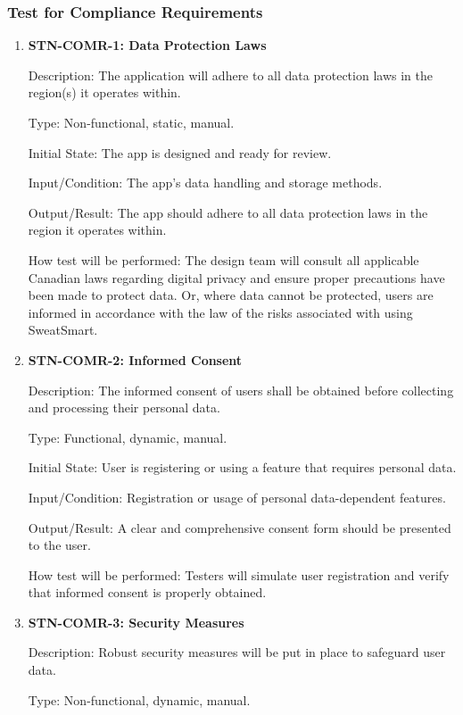 \documentclass[12pt, titlepage]{article}
\begin{document}
\subsubsection{Test for Compliance Requirements}

\begin{enumerate}

\item {\textbf{STN-COMR-1: Data Protection Laws}}

Description: The application will adhere to all data protection laws in the region(s) it operates within.

Type: Non-functional, static, manual.

Initial State: The app is designed and ready for review.

Input/Condition: The app's data handling and storage methods.

Output/Result: The app should adhere to all data protection laws in the region it operates within.

How test will be performed: The design team will consult all applicable Canadian laws regarding digital privacy and ensure proper precautions have been made to protect data. Or, where data cannot be protected, users are informed in accordance with the law of the risks associated with using SweatSmart. 

\item{\textbf{STN-COMR-2: Informed Consent}}

Description: The informed consent of users shall be obtained before collecting and processing their personal data.

Type: Functional, dynamic, manual.

Initial State: User is registering or using a feature that requires personal data.

Input/Condition: Registration or usage of personal data-dependent features.

Output/Result: A clear and comprehensive consent form should be presented to the user.

How test will be performed: Testers will simulate user registration and verify that informed consent is properly obtained.


\item{\textbf{STN-COMR-3: Security Measures}}

Description: Robust security measures will be put in place to safeguard user data.

Type: Non-functional, dynamic, manual.


\end{enumerate}
\end{document}
